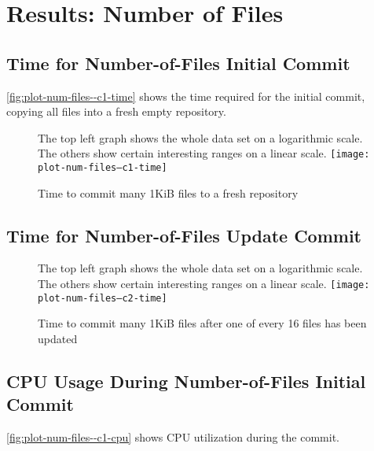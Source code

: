 %



\section{Results: Number of Files}


\subsection{Time for Number-of-Files Initial Commit}

\autoref{fig:plot-num-files--c1-time} shows the time required for the initial
\gls{commit}, copying all files into a fresh empty repository.


\begin{figure}[p]
    \caption{Time to commit many 1KiB files to a fresh repository}
    \label{fig:plot-num-files--c1-time}
    \centering
    The top left graph shows the whole data set on a logarithmic scale. The
    others show certain interesting ranges on a linear scale.
    \texttt{[image: plot-num-files--c1-time]}
\end{figure}

%


\subsection{Time for Number-of-Files Update Commit}


\begin{figure}[p]
    \caption{Time to commit many 1KiB files after one of every \num{16} files
    has been updated}
    \label{fig:plot-num-files--c2-time}
    \centering
    The top left graph shows the whole data set on a logarithmic scale. The
    others show certain interesting ranges on a linear scale.
    \texttt{[image: plot-num-files--c2-time]}
\end{figure}

%


\subsection{CPU Usage During Number-of-Files Initial Commit}

\autoref{fig:plot-num-files--c1-cpu} shows CPU utilization during the
\gls{commit}.


